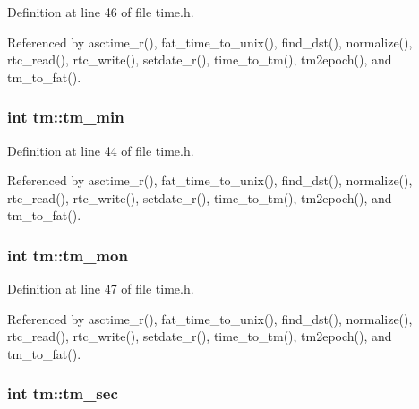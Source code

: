 Definition at line 46 of file time.\+h.



Referenced by asctime\+\_\+r(), fat\+\_\+time\+\_\+to\+\_\+unix(), find\+\_\+dst(), normalize(), rtc\+\_\+read(), rtc\+\_\+write(), setdate\+\_\+r(), time\+\_\+to\+\_\+tm(), tm2epoch(), and tm\+\_\+to\+\_\+fat().

\subsubsection[{\texorpdfstring{tm\+\_\+min}{tm_min}}]{\setlength{\rightskip}{0pt plus 5cm}int tm\+::tm\+\_\+min}\hypertarget{structtm_af414eb7c86cc3099595211eee4d4211b}{}\label{structtm_af414eb7c86cc3099595211eee4d4211b}


Definition at line 44 of file time.\+h.



Referenced by asctime\+\_\+r(), fat\+\_\+time\+\_\+to\+\_\+unix(), find\+\_\+dst(), normalize(), rtc\+\_\+read(), rtc\+\_\+write(), setdate\+\_\+r(), time\+\_\+to\+\_\+tm(), tm2epoch(), and tm\+\_\+to\+\_\+fat().

\subsubsection[{\texorpdfstring{tm\+\_\+mon}{tm_mon}}]{\setlength{\rightskip}{0pt plus 5cm}int tm\+::tm\+\_\+mon}\hypertarget{structtm_a112ac36fa2f593777138a417cf031e17}{}\label{structtm_a112ac36fa2f593777138a417cf031e17}


Definition at line 47 of file time.\+h.



Referenced by asctime\+\_\+r(), fat\+\_\+time\+\_\+to\+\_\+unix(), find\+\_\+dst(), normalize(), rtc\+\_\+read(), rtc\+\_\+write(), setdate\+\_\+r(), time\+\_\+to\+\_\+tm(), tm2epoch(), and tm\+\_\+to\+\_\+fat().

\subsubsection[{\texorpdfstring{tm\+\_\+sec}{tm_sec}}]{\setlength{\rightskip}{0pt plus 5cm}int tm\+::tm\+\_\+sec}\hypertarget{structtm_a4d098a9a5c03a00b2ee61e10851de81e}{}\label{structtm_a4d098a9a5c03a00b2ee61e10851de81e}


